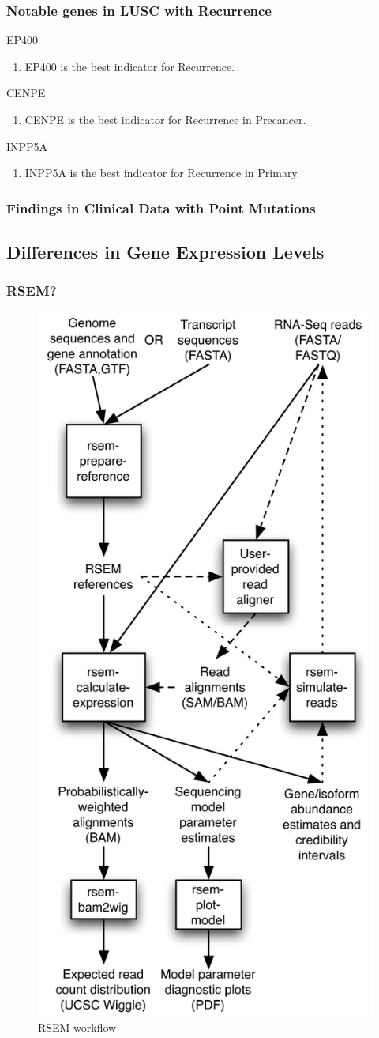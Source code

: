 \documentclass{beamer}
\begin{document}
    \begin{frame}[allowframebreaks]
        \frametitle{Notable genes in LUSC with Recurrence}

        \begin{block}{EP400}
            \begin{enumerate}
                \item EP400 is the best indicator for Recurrence.
            \end{enumerate}
        \end{block}

        \begin{block}{CENPE}
            \begin{enumerate}
                \item CENPE is the best indicator for Recurrence in Precancer.
            \end{enumerate}
        \end{block}

        \begin{block}{INPP5A}
            \begin{enumerate}
                \item INPP5A is the best indicator for Recurrence in Primary.
            \end{enumerate}
        \end{block}
    \end{frame}

    \begin{frame}
        \frametitle{Findings in Clinical Data with Point Mutations}
    \end{frame}

    \subsection{Differences in Gene Expression Levels}
    \begin{frame}
        \frametitle{RSEM?}

        \begin{figure}
            \includegraphics[width=0.2 \linewidth]{figures/Workflow/RSEM.jpg}
            \caption{RSEM workflow \protect\cite{RSEM1}}
        \end{figure}
    \end{frame}
\end{document}
